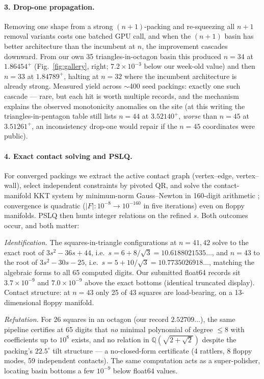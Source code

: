 \documentclass[11pt]{article}
\newcommand{\s}{\ensuremath{s}}
\begin{document}
\paragraph{3. Drop-one propagation.}
Removing one shape from a strong $(n{+}1)$-packing and re-squeezing all $n{+}1$
removal variants costs one batched GPU call, and when the $(n{+}1)$ basin has
better architecture than the incumbent at $n$, the improvement cascades
downward. From our own 35 triangles-in-octagon basin this produced $n=34$ at
$1.86454^{+}$ (Fig.~\ref{fig:gallery}, right; $7.2\times10^{-3}$ below our
week-old value) and then $n=33$ at
$1.84789^{+}$, halting at $n=32$ where the incumbent architecture is already
strong. Measured yield across $\sim$400 seed packings: exactly one such
cascade --- rare, but each hit is worth multiple records, and the mechanism
explains the observed monotonicity anomalies on the site (at this writing the
triangles-in-pentagon table still lists $n=44$ at $3.52140^{+}$, \emph{worse}
than $n=45$ at $3.51261^{+}$, an inconsistency drop-one would repair if the
$n=45$ coordinates were public).

\paragraph{4. Exact contact solving and PSLQ.}
For converged packings we extract the active contact graph (vertex--edge,
vertex--wall), select independent constraints by pivoted QR, and solve the
contact-manifold KKT system by minimum-norm Gauss--Newton in 160-digit
arithmetic \cite{mpmath}; convergence is quadratic ($|F|:10^{-8}\!\to\!10^{-160}$
in five iterations) even on floppy manifolds. PSLQ \cite{pslq} then hunts
integer relations on the refined $\s$. Both outcomes occur, and both matter:

\emph{Identification.} The squares-in-triangle configurations at $n=41,42$
solve to the exact root of $3\s^{2}-36\s+44$, i.e.\
$\s=6+8/\sqrt{3}=10.6188021535\ldots$, and $n=43$ to the root of
$3\s^{2}-30\s-25$, i.e.\ $\s=5+10/\sqrt{3}=10.7735026918\ldots$, matching the
algebraic forms to all 65 computed digits. Our submitted float64 records sit
$3.7\times10^{-9}$ and $7.0\times10^{-9}$ above the exact bottoms (identical
truncated display). Contact structure: at $n=43$ only 25 of 43 squares are
load-bearing, on a 13-dimensional floppy manifold.

\emph{Refutation.} For 26 squares in an octagon (our record $2.52709\ldots$),
the same pipeline certifies at 65 digits that \emph{no} minimal polynomial of
degree $\le 8$ with coefficients up to $10^{8}$ exists, and no relation in
$\mathbb{Q}(\sqrt{2+\sqrt{2}})$ despite the packing's $22.5^{\circ}$ tilt
structure --- a no-closed-form certificate (4 rattlers, 8 floppy modes, 59
independent contacts). The same computation acts as a super-polisher, locating
basin bottoms a few $10^{-9}$ below float64 values.
\end{document}
